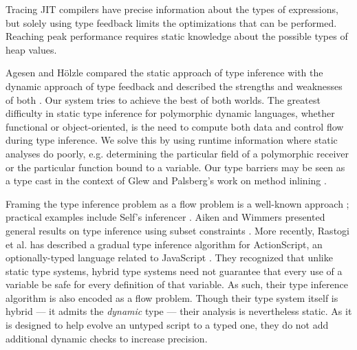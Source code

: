 Tracing JIT compilers \cite{GalVEE09, GalPLDI09}
have precise information about the types of expressions,
but solely using type feedback limits the optimizations that can
be performed.
Reaching peak performance requires static knowledge about
the possible types of heap values.

Agesen and H\"olzle compared the static approach of type inference with the
dynamic approach of type feedback and described the strengths and weaknesses
of both \cite{Agesen95}. Our system tries to achieve the best of both
worlds. The greatest difficulty in static type inference for polymorphic
dynamic languages, whether functional or object-oriented, is the need to
compute both data and control flow during type inference. We solve this by
using runtime information where static analyses do poorly,
e.g. determining the particular field of a polymorphic receiver or the
particular function bound to a variable. Our type barriers may be seen as a
type cast in the context of Glew and
Palsberg's work on method inlining \cite{Glew02}.

Framing the type inference problem as a flow problem is a well-known approach
\cite{Oxhoj92, Palsberg91}; practical examples include Self's inferencer
\cite{Agesen93TI}.
Aiken and Wimmers presented general results on
type inference using subset constraints \cite{Aiken93}.
More recently, Rastogi et al. has described a gradual type inference algorithm
for ActionScript, an optionally-typed language related to JavaScript
\cite{Rastogi12}. They recognized that unlike static type systems, hybrid type
systems need not guarantee that every use of a variable be safe for every
definition of that variable. As such, their type inference algorithm is also
encoded as a flow problem. Though their type system itself is hybrid --- it
admits the \emph{dynamic} type --- their analysis is nevertheless static. As
it is designed to help evolve an untyped script to a typed one, they do not
add additional dynamic checks to increase precision.


